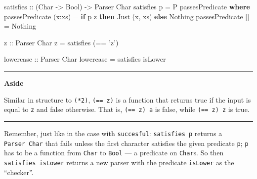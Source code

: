\documentclass[]{article}
\newenvironment{Shaded}{}{}
\newcommand{\KeywordTok}[1]{\textcolor[rgb]{0.00,0.44,0.13}{\textbf{{#1}}}}
\newcommand{\DataTypeTok}[1]{\textcolor[rgb]{0.56,0.13,0.00}{{#1}}}
\newcommand{\CharTok}[1]{\textcolor[rgb]{0.25,0.44,0.63}{{#1}}}
\newcommand{\OtherTok}[1]{\textcolor[rgb]{0.00,0.44,0.13}{{#1}}}
\newcommand{\FunctionTok}[1]{\textcolor[rgb]{0.02,0.16,0.49}{{#1}}}
\newcommand{\NormalTok}[1]{{#1}}
\begin{document}
\begin{Shaded}
\begin{Highlighting}[]
\OtherTok{satisfies ::} \NormalTok{(}\DataTypeTok{Char} \OtherTok{->} \DataTypeTok{Bool}\NormalTok{) }\OtherTok{->} \DataTypeTok{Parser} \DataTypeTok{Char}
\NormalTok{satisfies p }\FunctionTok{=} \DataTypeTok{P} \NormalTok{passesPredicate}
    \KeywordTok{where}
        \NormalTok{passesPredicate (x}\FunctionTok{:}\NormalTok{xs) }\FunctionTok{=}  \KeywordTok{if} \NormalTok{p z}
                                      \KeywordTok{then} \DataTypeTok{Just} \NormalTok{(x, xs)}
                                      \KeywordTok{else} \DataTypeTok{Nothing}
        \NormalTok{passesPredicate []     }\FunctionTok{=}  \DataTypeTok{Nothing}


\OtherTok{z ::} \DataTypeTok{Parser} \DataTypeTok{Char}
\NormalTok{z }\FunctionTok{=} \NormalTok{satisfies (}\FunctionTok{==} \CharTok{'z'}\NormalTok{)}

\OtherTok{lowercase ::} \DataTypeTok{Parser} \DataTypeTok{Char}
\NormalTok{lowercase }\FunctionTok{=} \NormalTok{satisfies isLower}
\end{Highlighting}
\end{Shaded}

\begin{center}\rule{0.5\linewidth}{\linethickness}\end{center}

\textbf{Aside}

Similar in structure to \texttt{(*2)},
\texttt{(==\ \textquotesingle{}z\textquotesingle{})} is a function that
returns true if the input is equal to
\texttt{\textquotesingle{}z\textquotesingle{}} and false otherwise. That
is,
\texttt{(==\ \textquotesingle{}z\textquotesingle{})\ \textquotesingle{}a\textquotesingle{}}
is false, while
\texttt{(==\ \textquotesingle{}z\textquotesingle{})\ \textquotesingle{}z\textquotesingle{}}
is true.

\begin{center}\rule{0.5\linewidth}{\linethickness}\end{center}

Remember, just like in the case with \texttt{succesful}:
\texttt{satisfies\ p} returns a \texttt{Parser\ Char} that fails unless
the first character satisfies the given predicate \texttt{p}; \texttt{p}
has to be a function from \texttt{Char} to \texttt{Bool} --- a predicate
on \texttt{Char}s. So then \texttt{satisfies\ isLower} returns a new
parser with the predicate \texttt{isLower} as the ``checker''.
\end{document}
